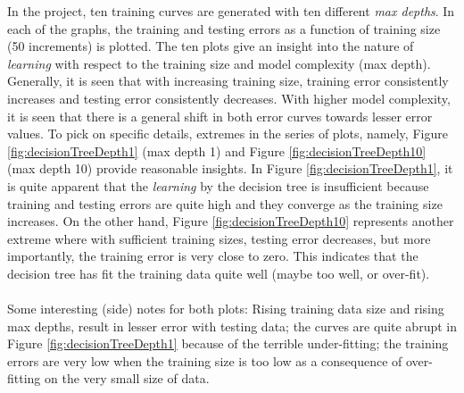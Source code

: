 \documentclass{article}
\begin{document}
	In the project, ten training curves are generated with ten different \emph{max depths}. In each of the graphs, the training and testing errors as a function of training size (50 increments) is plotted. The ten plots give an insight into the nature of \emph{learning} with respect to the training size and model complexity (max depth). Generally, it is seen that with increasing training size, training error consistently increases and testing error consistently decreases. With higher model complexity, it is seen that there is a general shift in both error curves towards lesser error values. To pick on specific details, extremes in the series of plots, namely, Figure \ref{fig:decisionTreeDepth1} (max depth 1) and Figure \ref{fig:decisionTreeDepth10} (max depth 10) provide reasonable insights. In Figure \ref{fig:decisionTreeDepth1}, it is quite apparent that the \emph{learning} by the decision tree is insufficient because training and testing errors are quite high and they converge as the training size increases. On the other hand, Figure \ref{fig:decisionTreeDepth10} represents another extreme where with sufficient training sizes, testing error decreases, but more importantly, the training error is very close to zero. This indicates that the decision tree has fit the training data quite well (maybe too well, or over-fit). 
	\paragraph{}Some interesting (side) notes for both plots: Rising training data size and rising max depths, result in lesser error with testing data; the curves are quite abrupt in Figure \ref{fig:decisionTreeDepth1} because of the terrible under-fitting; the training errors are very low when the training size is too low as a consequence of over-fitting on the very small size of data.
\end{document}
